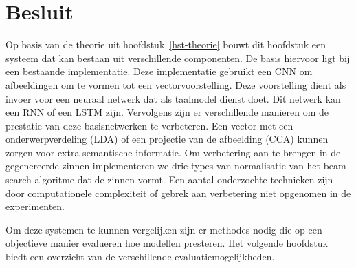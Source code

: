 \section{Besluit}
Op basis van de theorie uit hoofdstuk~\ref{hst-theorie} bouwt dit hoofdstuk een systeem dat kan bestaan uit verschillende componenten. De basis hiervoor ligt bij een bestaande implementatie. Deze implementatie gebruikt een CNN om afbeeldingen om te vormen tot een vectorvoorstelling. Deze voorstelling dient als invoer voor een neuraal netwerk dat als taalmodel dienst doet. Dit netwerk kan een RNN of een LSTM zijn. Vervolgens zijn er verschillende manieren om de prestatie van deze basisnetwerken te verbeteren.  Een vector met een onderwerpverdeling (LDA) of een projectie van de afbeelding (CCA) kunnen zorgen voor extra semantische informatie. Om verbetering aan te brengen in de gegenereerde zinnen implementeren we drie types van normalisatie van het beam-search-algoritme dat de zinnen vormt. Een aantal onderzochte technieken zijn door computationele complexiteit of gebrek aan verbetering niet opgenomen in de experimenten. 

Om deze systemen te kunnen vergelijken zijn er methodes nodig die op een objectieve manier evalueren hoe modellen presteren. Het volgende hoofdstuk biedt een overzicht van de verschillende evaluatiemogelijkheden.